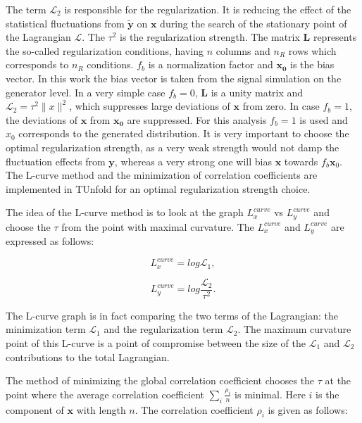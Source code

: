 The term $\mathcal{L}_{2}$ is responsible for the regularization. It is reducing the effect of the statistical fluctuations from $\tilde{\mathbf{y}}$ on $\mathbf{x}$
during the search of the stationary point of the Lagrangian $\mathcal{L}$. The $\tau^{2}$ is the regularization strength. The matrix $\mathbf{L}$
represents the so-called regularization conditions, having $n$ columns and $n_{R}$ rows which corresponds to $n_{R}$ conditions. $f_{b}$ is a normalization 
factor and $\mathbf{x_{0}}$ is the bias vector. In this work the bias vector is taken from the signal simulation on the generator level. 
In a very simple case $f_{b} = 0$, $\mathbf{L}$ is a unity matrix and $\mathcal{L}_{2} = \tau^{2} \parallel x \parallel^{2}$, which
suppresses large deviations of $\mathbf{x}$ from zero. In case $f_{b} = 1$, the deviations of $\mathbf{x}$ from $\mathbf{x_{0}}$ are
suppressed. For this analysis $f_{b} = 1$ is used and $x_{0}$ corresponds to the generated distribution. It is very important to choose 
the optimal regularization strength, as a very weak strength would not damp the fluctuation effects from $\mathbf{y}$, whereas a very strong 
one will bias $\mathbf{x}$ towards $f_{b}\mathbf{x}_{0}$. The L-curve method \cite{Hansen00thel-curve} and the minimization
of correlation coefficients \cite{VBlobelT} are implemented in TUnfold for an optimal regularization strength choice. 

The idea of the L-curve method is to look at the graph $L_{x}^{curve}$ vs $L_{y}^{curve}$ and choose the $\tau$ from the point with
maximal curvature. The $L_{x}^{curve}$ and $L_{y}^{curve}$ are expressed as follows:

\begin{equation}
 L_{x}^{curve} = log \mathcal{L}_{1},
\end{equation}

\begin{equation}
 L_{y}^{curve} = log \frac{\mathcal{L}_{2}}{\tau^{2}}.
\end{equation}

The L-curve graph is in fact comparing the two terms of the Lagrangian: the minimization term $\mathcal{L}_{1}$ and the regularization term $\mathcal{L}_2$.
The maximum curvature point of this L-curve is a point of compromise between the size of the $\mathcal{L}_{1}$ and $\mathcal{L}_{2}$ contributions
to the total Lagrangian.

The method of minimizing the global correlation coefficient chooses the $\tau$ at the point where the average correlation coefficient 
$\sum_{i} \frac{\rho_{i}}{n}$ is minimal. Here $i$ is the component of $\mathbf{x}$ with length $n$. The correlation coefficient $\rho_{i}$ is given as follows:

